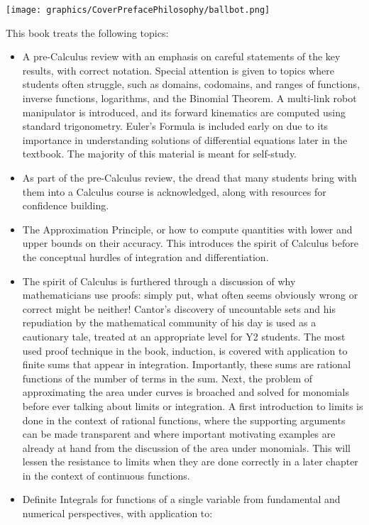     \begin{center}
    \texttt{[image: graphics/CoverPrefacePhilosophy/ballbot.png]}
    \end{center}

This book treats the following topics:
\begin{itemize}
    \item A pre-Calculus review with an emphasis on careful statements of the key results, with correct notation. Special attention is given to topics where students often struggle, such as domains, codomains, and ranges of functions, inverse functions, logarithms, and the Binomial Theorem. A multi-link robot manipulator is introduced, and its forward kinematics are computed using standard trigonometry. Euler's Formula is included early on due to its importance in understanding solutions of differential equations later in the textbook. The majority of this material is meant for self-study. 
    \item As part of the pre-Calculus review, the dread that many students bring with them into a Calculus course is acknowledged, along with resources for confidence building. 
    \item The Approximation Principle, or how to compute quantities with lower and upper bounds on their accuracy. This introduces the spirit of Calculus before the conceptual hurdles of integration and differentiation.
    \item The spirit of Calculus is furthered through a discussion of why mathematicians use proofs: simply put, what often seems obviously wrong or correct might be neither! Cantor's discovery of uncountable sets and his repudiation by the mathematical community of his day is used as a cautionary tale, treated at an appropriate level for Y2 students. The most used proof technique in the book, induction, is covered with application to finite sums that appear in integration. Importantly, these sums are rational functions of the number of terms in the sum. Next, the problem of approximating the area under curves is broached and solved for monomials before ever talking about limits or integration. A first introduction to limits is done in the context of rational functions, where the supporting arguments can be made transparent and where important motivating examples are already at hand from the discussion of the area under monomials. This will lessen the resistance to limits when they are done correctly in a later chapter in the context of continuous functions.
    \item Definite Integrals for functions of a single variable from fundamental and numerical perspectives, with application to:

\end{itemize}
